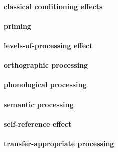 \documentclass[
]{krantz}
\begin{document}
\hypertarget{classical-conditioning-effects}{%
\paragraph*{classical conditioning effects}\label{classical-conditioning-effects}}

\hypertarget{priming}{%
\paragraph*{priming}\label{priming}}

\hypertarget{levels-of-processing-effect}{%
\paragraph*{levels-of-processing effect}\label{levels-of-processing-effect}}

\hypertarget{orthographic-processing}{%
\paragraph*{orthographic processing}\label{orthographic-processing}}

\hypertarget{phonological-processing}{%
\paragraph*{phonological processing}\label{phonological-processing}}

\hypertarget{semantic-processing}{%
\paragraph*{semantic processing}\label{semantic-processing}}

\hypertarget{self-reference-effect}{%
\paragraph*{self-reference effect}\label{self-reference-effect}}

\hypertarget{transfer-appropriate-processing}{%
\paragraph*{transfer-appropriate processing}\label{transfer-appropriate-processing}}
\end{document}
